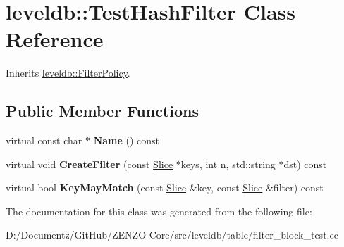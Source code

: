 \hypertarget{classleveldb_1_1_test_hash_filter}{}\section{leveldb\+::Test\+Hash\+Filter Class Reference}
\label{classleveldb_1_1_test_hash_filter}


Inherits \mbox{\hyperlink{classleveldb_1_1_filter_policy}{leveldb\+::\+Filter\+Policy}}.

\subsection*{Public Member Functions}
\begin{DoxyCompactItemize}
\item 
\mbox{\label{classleveldb_1_1_test_hash_filter_ab850484e0c3d5fa3721c91eab9fc83a4}} 
virtual const char $\ast$ {\bfseries Name} () const
\item 
\mbox{\label{classleveldb_1_1_test_hash_filter_ac51313bc9f5f4fd64b49ae8c956bfc00}} 
virtual void {\bfseries Create\+Filter} (const \mbox{\hyperlink{classleveldb_1_1_slice}{Slice}} $\ast$keys, int n, std\+::string $\ast$dst) const
\item 
\mbox{\label{classleveldb_1_1_test_hash_filter_ae2d2ab00456a3ac3d3c5e04e6829ed72}} 
virtual bool {\bfseries Key\+May\+Match} (const \mbox{\hyperlink{classleveldb_1_1_slice}{Slice}} \&key, const \mbox{\hyperlink{classleveldb_1_1_slice}{Slice}} \&filter) const
\end{DoxyCompactItemize}


The documentation for this class was generated from the following file\+:\begin{DoxyCompactItemize}
\item 
D\+:/\+Documentz/\+Git\+Hub/\+Z\+E\+N\+Z\+O-\/\+Core/src/leveldb/table/filter\+\_\+block\+\_\+test.\+cc\end{DoxyCompactItemize}
